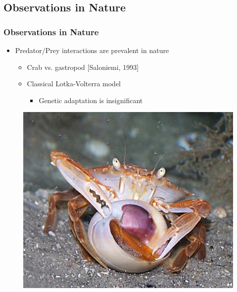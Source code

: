 \documentclass[10pt]{beamer}
\begin{document}
\subsection{Observations in Nature}
\begin{frame}
	\frametitle{Observations in Nature}
	\begin{minipage}{0.65\textwidth}
		\begin{itemize}
			\item Predator/Prey interactions are prevalent in nature
			\begin{itemize}
				\item Crab vs. gastropod {\tiny[Saloniemi, 1993]}
				\item Classical Lotka-Volterra model
				\begin{itemize}
					\item Genetic adaptation is insignificant
				\end{itemize}
			\end{itemize} \vspace{15pt}
		\end{itemize}
	\end{minipage}
	\begin{minipage}{0.25\textwidth}
		\begin{figure}
			\includegraphics[width=1.5\textwidth]{figures/crab_eating_gastropod.jpg}
		\end{figure}
	\end{minipage}
\end{frame}
\end{document}
